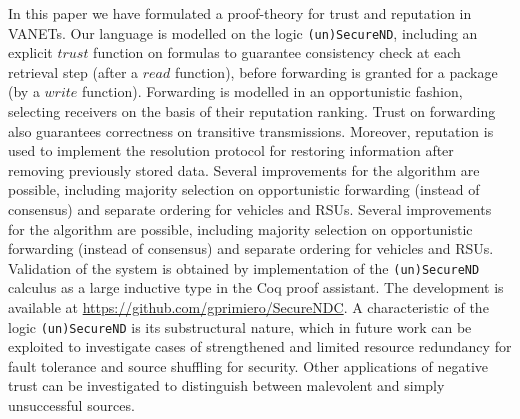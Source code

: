 \documentclass[compsoc, conference, letterpaper, 10pt, times]{IEEEtran}
\begin{document}
In this paper we have formulated a proof-theory for trust and reputation in VANETs. Our language is modelled on the logic \texttt{(un)SecureND}, including an explicit $trust$ function on formulas to guarantee consistency check at each retrieval step (after a $read$ function), before forwarding is granted for a package (by a $write$ function). Forwarding is modelled in an opportunistic fashion, selecting receivers on the basis of their reputation ranking. Trust on forwarding also guarantees correctness on transitive transmissions. Moreover, reputation is used to implement the resolution protocol for restoring information after removing previously stored data. Several improvements for the algorithm are possible, including majority selection on opportunistic forwarding (instead of consensus) and separate ordering for vehicles and RSUs. Several improvements for the algorithm are possible, including majority selection on opportunistic forwarding (instead of consensus) and separate ordering for vehicles and RSUs.
Validation of the system is obtained by implementation of the \texttt{(un)SecureND} calculus as a large inductive type in the Coq proof assistant. The development is available at \url{https://github.com/gprimiero/SecureNDC}. 
A characteristic of the logic \texttt{(un)SecureND} is its substructural nature, which in future work can be exploited to investigate cases of strengthened and limited resource redundancy for fault tolerance and source shuffling for security. Other applications of negative trust can be investigated to distinguish between malevolent and simply unsuccessful sources.




\end{document}
